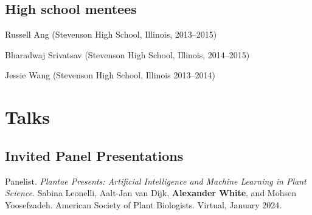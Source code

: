 \documentclass[letterpaper]{article}
\renewenvironment{itemize}{
  \begin{list}{}{
    \setlength{\leftmargin}{1.5em}
  }
}{
  \end{list}
}
\newenvironment{biblist}{%
   \begin{list}{}{%
     \setlength{\labelwidth}{0pt}%
     \setlength{\labelsep}{1em}%
     \setlength{\leftmargin}{2em}%
     \setlength{\itemindent}{-1em}%
   }
}{\end{list}}
\begin{document}
\subsection*{High school mentees}
\begin{itemize}
\item Russell Ang (Stevenson High School, Illinois, 2013--2015)
\item Bharadwaj Srivatsav (Stevenson High School, Illinois, 2014--2015)
\item Jessie Wang (Stevenson High School, Illinois 2013--2014)
\end{itemize}

\section*{Talks}
\subsection*{Invited Panel Presentations}
\begin{biblist}
\item Panelist. \textit{Plantae Presents: Artificial Intelligence and Machine Learning in Plant Science}. Sabina Leonelli, Aalt-Jan van Dijk, \textbf{Alexander White}, and Mohsen Yoosefzadeh. American Society of Plant Biologists. Virtual, January 2024.
\end{biblist}
\end{document}
